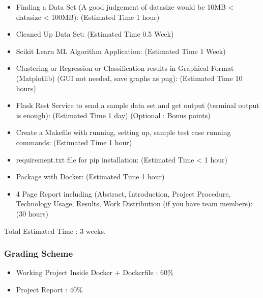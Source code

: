\begin{itemize}
\item Finding a Data Set (A good judgement of datasize would be 10MB < datasize < 100MB): (Estimated Time 1 hour)
\item Cleaned Up Data Set: (Estimated Time 0.5 Week)
\item Scikit Learn ML Algorithm Application: (Estimated Time 1 Week)
\item Clustering or Regression or Classification results in Graphical
  Format (Matplotlib) (GUI not needed, save graphs as png): (Estimated
  Time 10 hours)
\item Flask  Rest Service  to send  a sample data  set and  get output
  (terminal output is enough): (Estimated Time 1 day) (Optional : Bonus
  points)
\item Create a Makefile with running, setting up, sample test case
  running commands: (Estimated Time 1 hour)
\item requirement.txt file for pip installation: (Estimated Time < 1 hour)
\item Package with Docker: (Estimated Time 1 hour)
\item 4 Page Report including (Abstract, Introduction, Project
  Procedure, Technology Usage, Results, Work Distribution (if you have
  team members): (30 hours)
\end{itemize}

Total Estimated Time : 3 weeks.

\subsubsection{Grading Scheme}

\begin{itemize}
\item Working Project Inside Docker + Dockerfile : 60\%
\item Project Report : 40\%
\end{itemize}

